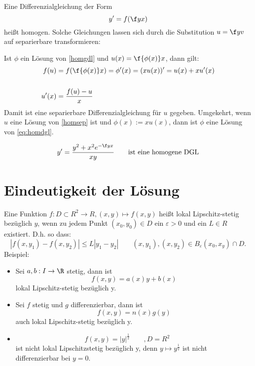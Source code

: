 \documentclass[a4paper,10pt]{scrbook}
\begin{document}
Eine Differenzialgleichung der Form
\[
\label{eq:homdgl}
y'=f(\f yx)
\]
heißt homogen. Solche Gleichungen lassen sich durch die Substitution
$u=\f yv$ auf separierbare transformieren:

Ist $\phi$ ein Lösung von \eqref{homgdl} und $u(x) = \f{\phi (x)}x$, dann gilt:
\begin{align*}
	f(u) &= f(\f{\phi(x)}x) = \phi'(x) = (xu(x))'=u(x) + xu'(x)\\
\label{homsep}\\
u'(x) &= \frac{f(u)-u}{x}
\end{align*}
Damit ist eine separierbare Differenzialgleichung für $u$ gegeben.
Umgekehrt, wenn $u$ eine Lösung von \eqref{homsep} ist und $\phi(x):=xu(x)$, dann
ist $\phi$ eine Lösung von \eqref{eq:homdgl}.

\begin{ex*}
\[
y'=\frac{y^2+x^2e^{-\f yx}}{xy} \qquad \text{ist eine homogene DGL}
\]
\end{ex*}

\section{Eindeutigkeit der Lösung}

Eine Funktion $f:D\subset R^2\to R, (x,y)\mapsto f(x,y)$ heißt lokal Lipschitz-stetig
bezüglich $y$, wenn zu jedem Punkt $(x_0,y_0)\in D$ ein $\varepsilon > 0$ und ein $L\in R$ existiert.
D.h. so dass:
\[
|f(x,y_1)-f(x,y_2)| \le L|y_1-y_2| \qquad 
(x,y_1),(x,y_2) \in B_\varepsilon (x_0,x_y) \cap D.
\]
Beispiel:
\begin{itemize}
\item
Sei $a,b:I\to\R$ stetig, dann ist
\[
f(x,y)=a(x)y + b(x)
\]
lokal Lipschitz-stetig bezüglich y.
\item
Sei $f$ stetig und $g$ differenzierbar, dann ist
\[
f(x,y) = n(x)g(y)
\]
auch lokal Lipschitz-stetig bezüglich y.
\item
\[
f(x,y)={|y|}^{\frac 12} \qquad, D=R^2 \qquad
\]
ist nicht lokal Lipschitzstetig bezüglich y, denn $y\mapsto y^{\frac 12}$ ist nicht differenzierbar bei $y=0$.
\end{itemize}
\end{document}
